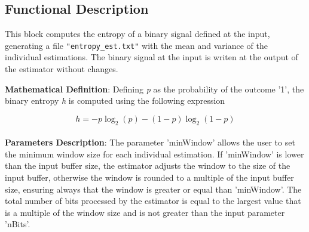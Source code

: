\subsection*{Functional Description}
This block computes the entropy of a binary signal defined at the input, generating 
a file \texttt{"entropy\_est.txt"} with the mean and variance of the individual estimations.
The binary signal at the input is writen at the output of the estimator without changes.

\textbf{Mathematical Definition}: Defining \textit{p} as the probability of the 
outcome '1', the binary entropy \textit{h} is computed using the following expression

\begin{equation}
h = -p\log_2(p) - (1-p)\log_2(1-p)
\end{equation}  
   
\paragraph{}
\textbf{Parameters Description}: The parameter 'minWindow' allows the user to set the 
minimum window size for each individual estimation. If 'minWindow' is lower than the 
input buffer size, the estimator adjusts the window to the size of the input buffer, 
otherwise the window is rounded to a multiple of the input buffer size, ensuring always 
that the window is greater or equal than 'minWindow'. The total number of bits processed 
by the estimator is equal to the largest value that is a multiple of the window size and 
is not greater than the input parameter 'nBits'.




